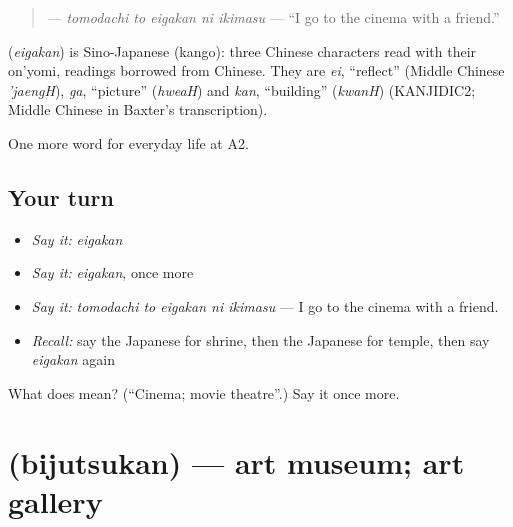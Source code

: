 \begin{quote}
\textbf{  } — \emph{tomodachi to eigakan ni ikimasu} — \textquotedblleft{}I go to the cinema with a friend.\textquotedblright{}
\end{quote}

\begin{cousinweb}
\textbf{} (\emph{eigakan}) is Sino-Japanese (kango): three Chinese characters read with their on'yomi, readings borrowed from Chinese. They are \emph{ei}, \textquotedblleft{}reflect\textquotedblright{} (Middle Chinese \emph{'jaengH}), \emph{ga}, \textquotedblleft{}picture\textquotedblright{} (\emph{hweaH}) and \emph{kan}, \textquotedblleft{}building\textquotedblright{} (\emph{kwanH}) (KANJIDIC2; Middle Chinese in Baxter's transcription).
\end{cousinweb}

\begin{grammarlens}[title={What you've built}]
One more word for everyday life at A2.
\end{grammarlens}

\subsection*{Your turn}
\begin{itemize}
\raggedright
  \item \emph{Say it:} \emph{eigakan}
  \item \emph{Say it:} \emph{eigakan}, once more
  \item \emph{Say it:} \emph{tomodachi to eigakan ni ikimasu} — I go to the cinema with a friend.
  \item \emph{Recall:} say the Japanese for shrine, then the Japanese for temple, then say \emph{eigakan} again
\end{itemize}

\begin{tcolorbox}[breakable,colback=teal!4,colframe=teal!35!black,title={Before you move on}]
What does  mean? (\textquotedblleft{}Cinema; movie theatre\textquotedblright{}.) Say it once more.
\end{tcolorbox}
\section[\texorpdfstring{\ja{びじゅつかん} (bijutsukan)}{びじゅつかん (bijutsukan)}]{ (bijutsukan) — art museum; art gallery}

